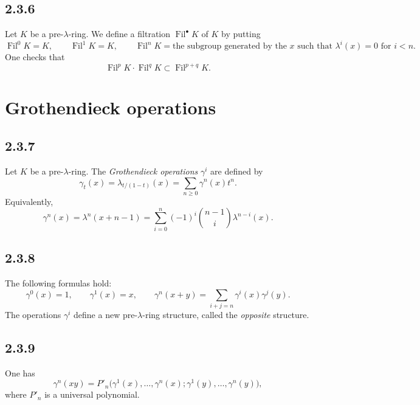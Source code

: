 \documentclass[11pt]{article}
\theoremstyle{plain}
\theoremstyle{definition}
\theoremstyle{remark}
\providecommand{\Fil}{\operatorname{Fil}}
\begin{document}
\subsection*{2.3.6}
Let $K$ be a pre-$\lambda$-ring. We define a filtration $\Fil^\bullet K$ of $K$ by putting
\begin{equation}\label{eq:2.3.6}
\Fil^0K=K,
\qquad
\Fil^1K=K,
\qquad
\Fil^nK=\text{the subgroup generated by the }x\text{ such that }\lambda^i(x)=0\text{ for }i<n.
\end{equation}
One checks that
\[
\Fil^pK\cdot \Fil^qK\subset \Fil^{p+q}K.
\]

\section*{Grothendieck operations}

\subsection*{2.3.7}
Let $K$ be a pre-$\lambda$-ring. The \emph{Grothendieck operations} $\gamma^i$ are defined by
\begin{equation}\label{eq:2.3.7a}
\gamma_t(x)=\lambda_{t/(1-t)}(x)=\sum_{n\geq 0}\gamma^n(x)t^n.
\end{equation}
Equivalently,
\begin{equation}\label{eq:2.3.7b}
\gamma^n(x)=\lambda^n(x+n-1)=\sum_{i=0}^{n}(-1)^i\binom{n-1}{i}\lambda^{n-i}(x).
\end{equation}

\subsection*{2.3.8}
The following formulas hold:
\begin{equation}\label{eq:2.3.8}
\gamma^0(x)=1,
\qquad
\gamma^1(x)=x,
\qquad
\gamma^n(x+y)=\sum_{i+j=n}\gamma^i(x)\gamma^j(y).
\end{equation}
The operations $\gamma^i$ define a new pre-$\lambda$-ring structure, called the \emph{opposite} structure.

\subsection*{2.3.9}
One has
\begin{equation}\label{eq:2.3.9}
\gamma^n(xy)=P'_n\bigl(\gamma^1(x),\ldots,\gamma^n(x);\gamma^1(y),\ldots,\gamma^n(y)\bigr),
\end{equation}
where $P'_n$ is a universal polynomial.
\end{document}
